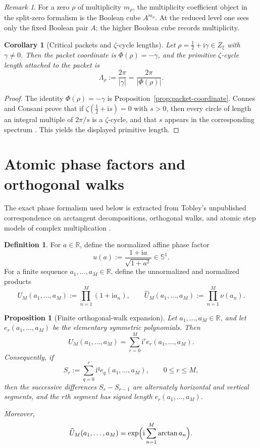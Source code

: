 \documentclass[11pt]{amsart}
\numberwithin{equation}{section}
\newtheorem{proposition}[theorem]{Proposition}
\newtheorem{corollary}[theorem]{Corollary}
\theoremstyle{definition}
\newtheorem{definition}[theorem]{Definition}
\theoremstyle{remark}
\newtheorem{remark}[theorem]{Remark}
\newcommand{\RR}{\mathbb R}
\newcommand{\Sph}{\mathbb S^1}
\newcommand{\ii}{\mathrm i}
\begin{document}
\begin{remark}
For a zero $\rho$ of multiplicity $m_\rho$, the multiplicity coefficient object in the split-zero formalism is the Boolean cube $A^{m_\rho}$.  At the reduced level one sees only the fixed Boolean pair $A$; the higher Boolean cube records multiplicity.
\end{remark}

\begin{corollary}[Critical packets and $\zeta$-cycle lengths]\label{cor:critical-length}
Let $\rho=\tfrac12+\ii\gamma\in Z_\xi$ with $\gamma\neq0$.  Then the packet coordinate is $\Phi(\rho)=-\gamma$, and the primitive $\zeta$-cycle length attached to the packet is
\[
\Lambda_\rho:=\frac{2\pi}{|\gamma|}=\frac{2\pi}{|\Phi(\rho)|}.
\]
\end{corollary}

\begin{proof}
The identity $\Phi(\rho)=-\gamma$ is Proposition~\ref{prop:packet-coordinate}.  Connes and Consani prove that if $\zeta(\tfrac12+\ii s)=0$ with $s>0$, then every circle of length an integral multiple of $2\pi/s$ is a $\zeta$-cycle, and that $s$ appears in the corresponding spectrum \cite[Theorem~1.1(ii)]{ConnesConsaniCycles}.  This yields the displayed primitive length.
\end{proof}

\section{Atomic phase factors and orthogonal walks}

The exact phase formalism used below is extracted from Tobley's unpublished correspondence on arctangent decompositions, orthogonal walks, and atomic step models of complex multiplication \cite{Tobley}.

\begin{definition}
For $a\in\RR$, define the normalized affine phase factor
\[
u(a):=\frac{1+\ii a}{\sqrt{1+a^2}}\in\Sph.
\]
For a finite sequence $a_1,\dots,a_M\in\RR$, define the unnormalized and normalized products
\[
U_M(a_1,\dots,a_M):=\prod_{n=1}^M (1+\ii a_n),
\qquad
\widehat U_M(a_1,\dots,a_M):=\prod_{n=1}^M \nu(a_n).
\]
\end{definition}

\begin{proposition}[Finite orthogonal-walk expansion]\label{prop:finite-orthogonal}
Let $a_1,\dots,a_M\in\RR$, and let $e_r(a_1,\dots,a_M)$ be the elementary symmetric polynomials.  Then
\[
U_M(a_1,\dots,a_M)=\sum_{r=0}^M \ii^r e_r(a_1,\dots,a_M).
\]
Consequently, if
\[
S_r:=\sum_{q=0}^r \ii^q e_q(a_1,\dots,a_M),
\qquad 0\le r\le M,
\]
then the successive differences $S_r-S_{r-1}$ are alternately horizontal and vertical segments, and the $r$th segment has signed length $e_r(a_1,\dots,a_M)$.

Moreover,
\[
\widehat U_M(a_1,\dots,a_M)=\exp\Bigl(\ii\sum_{n=1}^M \arctan a_n\Bigr).
\]
\end{proposition}
\end{document}
